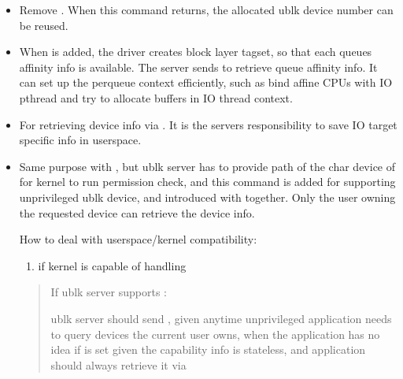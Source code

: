 \documentclass[a4paper,11pt,english]{sphinxmanual}
\begin{document}
\begin{itemize}
\item {} 

Remove . When this command returns, the allocated ublk device
number can be reused.

\item {} 

When  is added, the driver creates block layer tagset, so
that each queue\textquotesingle{}s affinity info is available. The server sends
 to retrieve queue affinity info. It can
set up the per\sphinxhyphen{}queue context efficiently, such as bind affine CPUs with IO
pthread and try to allocate buffers in IO thread context.

\item {} 

For retrieving device info via . It is the server\textquotesingle{}s
responsibility to save IO target specific info in userspace.

\item {} 
Same purpose with , but ublk server has to
provide path of the char device of  for kernel to run
permission check, and this command is added for supporting unprivileged
ublk device, and introduced with  together.
Only the user owning the requested device can retrieve the device info.

How to deal with userspace/kernel compatibility:
\begin{enumerate}
%
\item {} 
if kernel is capable of handling 

\end{enumerate}
\begin{quote}

If ublk server supports :

ublk server should send , given anytime
unprivileged application needs to query devices the current user owns,
when the application has no idea if  is set
given the capability info is stateless, and application should always
retrieve it via 


\end{quote}
\end{itemize}
\end{document}

